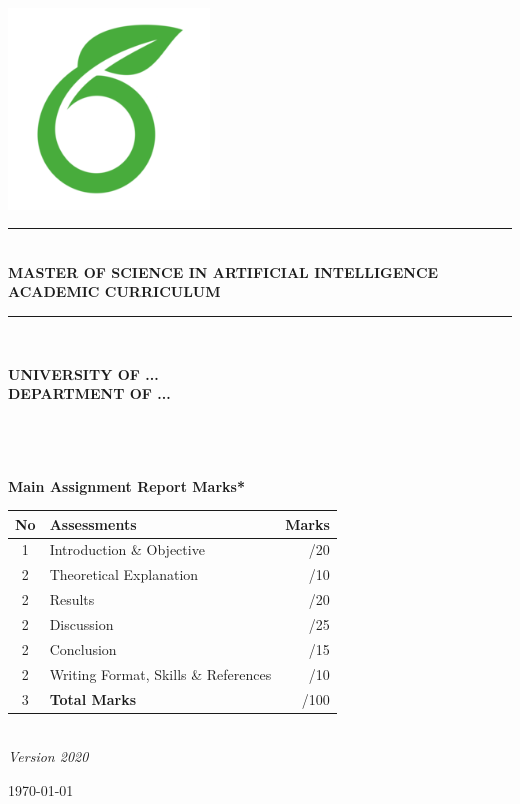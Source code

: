 \begin{titlepage}
\newcommand{\HRule}{\rule{\linewidth}{0.5mm}}                           %
\center


\includegraphics[width=0.4\textwidth]{logo.png}\\[0.2cm]  %

\HRule \\[0.8cm]
\textbf{\Large MASTER OF SCIENCE IN ARTIFICIAL INTELLIGENCE}\\[0.2cm]
\textbf{\Large ACADEMIC CURRICULUM}\\[0.8cm]
\HRule \\
\vfill

\textbf{\large UNIVERSITY OF ...  }\\
\textbf{\large DEPARTMENT OF ... }\\

\vfill
\\
\\
\\

\vfill

\textbf{Main Assignment Report Marks*}\\
\begin{tabular}{|c|l|r|}
\hline
\textbf{No} & \textbf{Assessments} & \textbf{Marks} \\
\hline 
\hline
 1 &  Introduction \& Objective & /20 \\
\hline
 2 &    Theoretical Explanation  & /10 \\
 \hline
  2 &    Results  & /20 \\
  \hline
   2 &    Discussion  & /25 \\
   \hline
    2 &    Conclusion  & /15 \\
    \hline
     2 &    Writing Format, Skills \& References  & /10 \\
\hline
\hline
 3 &    \textbf{Total Marks}  & /100 \\
\hline
\end{tabular}\\
\textit{\small *Version 2020}
\vfill



{\large \today}\\
\vfill
\end{titlepage}